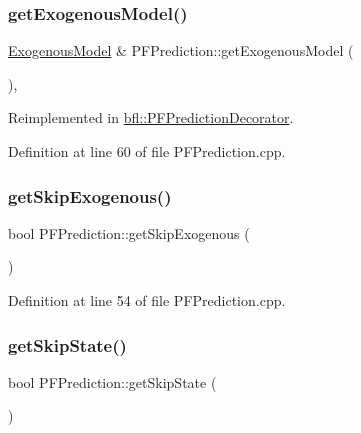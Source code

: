 \subsubsection{\texorpdfstring{get\+Exogenous\+Model()}{getExogenousModel()}}
{\footnotesize\ttfamily \mbox{\hyperlink{classbfl_1_1ExogenousModel}{Exogenous\+Model}} \& P\+F\+Prediction\+::get\+Exogenous\+Model (\begin{DoxyParamCaption}{ }\end{DoxyParamCaption})\hspace{0.3cm}{\ttfamily [virtual]}, {\ttfamily [inherited]}}



Reimplemented in \mbox{\hyperlink{classbfl_1_1PFPredictionDecorator_a8d25d3765f642f7de1af897d088d8da9}{bfl\+::\+P\+F\+Prediction\+Decorator}}.



Definition at line 60 of file P\+F\+Prediction.\+cpp.

\mbox{\label{classbfl_1_1PFPrediction_a432b8e84dbf00432158aa82312386d63}} 
\subsubsection{\texorpdfstring{get\+Skip\+Exogenous()}{getSkipExogenous()}}
{\footnotesize\ttfamily bool P\+F\+Prediction\+::get\+Skip\+Exogenous (\begin{DoxyParamCaption}{ }\end{DoxyParamCaption})\hspace{0.3cm}{\ttfamily [inherited]}}



Definition at line 54 of file P\+F\+Prediction.\+cpp.

\mbox{\label{classbfl_1_1PFPrediction_a323ca5612dd7ad924fd448a629359ad2}} 
\subsubsection{\texorpdfstring{get\+Skip\+State()}{getSkipState()}}
{\footnotesize\ttfamily bool P\+F\+Prediction\+::get\+Skip\+State (\begin{DoxyParamCaption}{ }\end{DoxyParamCaption})\hspace{0.3cm}{\ttfamily [inherited]}}



